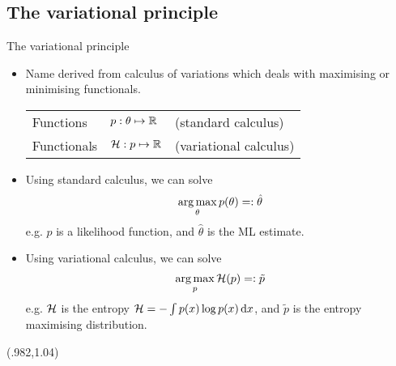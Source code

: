 \subsection{The variational principle}

\begin{frame}[label=variationalprinc]{The variational principle}
  \vspace{-10pt}
  \begin{itemize}[<+->]
    \item Name derived from calculus of variations which deals with maximising or minimising functionals.
    \begin{table}
      \begin{tabular}{l  l  l }
      Functions   &$p:\theta \mapsto \mathbb{R}$  &(standard calculus) \\ 
      Functionals &${\mathcal H}:p \mapsto \mathbb{R}$     &(variational calculus) \\ 
      \end{tabular}
    \end{table}
  \item Using standard calculus, we can solve
  \[
    \operatorname*{arg\,max}_\theta p(\theta) =: \hat\theta
  \]
  e.g. $p$ is a likelihood function, and $\hat\theta$ is the ML estimate.
  \item Using variational calculus, we can solve
  \[
    \operatorname*{arg\,max}_p {\mathcal H}(p) =: \tilde p
  \]
  e.g. ${\mathcal H}$ is the entropy ${\mathcal H} = - \int p(x)\log p(x) \, \text{d} x$, and $\tilde p$ is the entropy maximising distribution.
  \end{itemize}
  \vspace{5pt}
  
  \begin{textblock*}{3cm}(.982\textwidth,1.04\textheight)%
    \hyperlink{idea}{}      
  \end{textblock*}
\end{frame}

